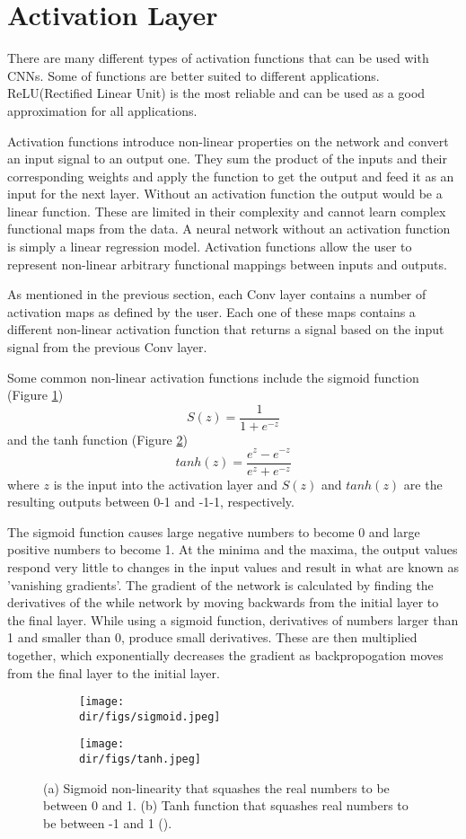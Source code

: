 \section{Activation Layer}
There are many different types of activation functions that can be used with CNNs. Some of functions are better suited to different applications. ReLU(Rectified Linear Unit) is the most reliable and can be used as a good approximation for all applications. \par
Activation functions introduce non-linear properties on the network and convert an input signal to an output one. They sum the product of the inputs and their corresponding weights and apply the function to get the output and feed it as an input for the next layer. Without an activation function the output would be a linear function. These are limited in their complexity and cannot learn complex functional maps from the data. A neural network without an activation function is simply a linear regression model. Activation functions allow the user to represent non-linear arbitrary functional mappings between inputs and outputs. \par
As mentioned in the previous section, each Conv layer contains a number of activation maps as defined by the user. Each one of these maps contains a different non-linear activation function that returns a signal based on the input signal from the previous Conv layer. 
\par
Some common non-linear activation functions include the sigmoid function (Figure \ref{fig.sigmoid})
\[S(z) = \frac{1} {1 + e^{-z}}\]
and the tanh function (Figure \ref{fig.tanh})
\[tanh(z) = \frac{e^{z} - e^{-z}}{e^{z} + e^{-z}}\]
where $z$ is the input into the activation layer and $S(z)$ and $tanh(z)$ are the resulting outputs between 0-1 and -1-1, respectively.
\par
The sigmoid function causes large negative numbers to become 0 and large positive numbers to become 1. At the minima and the maxima, the output values respond very little to changes in the input values and result in what are known as 'vanishing gradients'. The gradient of the network is calculated by finding the derivatives of the while network by moving backwards from the initial layer to the final layer. While using a sigmoid function, derivatives of numbers larger than 1 and smaller than 0, produce small derivatives. These are then multiplied together, which exponentially decreases the gradient as backpropogation moves from the final layer to the initial layer.  
\begin{figure}[htbp]
\centering
\begin{subfigure}{0.45\textwidth}
\texttt{[image: \\dir/figs/sigmoid.jpeg]}
\caption{}
\label{fig.sigmoid}
\end{subfigure}%
\qquad
\begin{subfigure}{0.45\textwidth}
\texttt{[image: \\dir/figs/tanh.jpeg]}
\caption{}
\label{fig.tanh}
\end{subfigure}
\caption[Sigmoid Activation Functions and Derivative]{(a) Sigmoid non-linearity that squashes the real numbers to be between 0 and 1. (b) Tanh function that squashes real numbers to be between -1 and 1 (\cite{Karpathy1}).}
\label{fig.activation_functions}
\end{figure}
